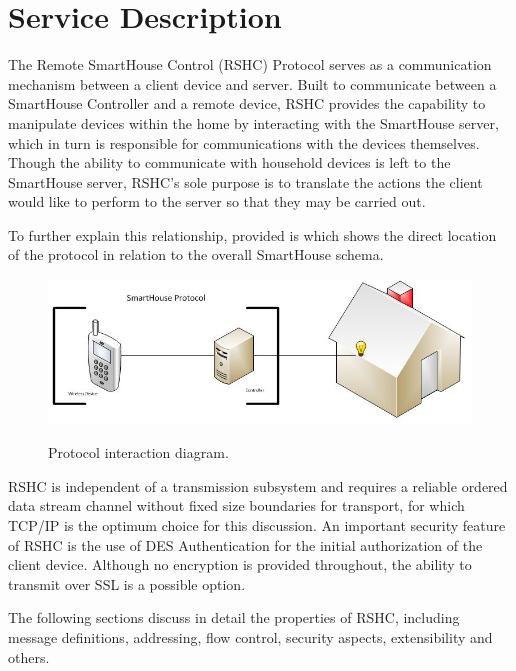 \section{Service Description}
\label{sec:serv_desc}

The Remote SmartHouse Control (RSHC) Protocol serves as a communication mechanism between a client device and server. Built to communicate between a SmartHouse Controller and a remote device, RSHC provides the capability to manipulate devices within the home by interacting with the SmartHouse server, which in turn is responsible for communications with the devices themselves. Though the ability to communicate with household devices is left to the SmartHouse server, RSHC's sole purpose is to translate the actions the client would like to perform to the server so that they may be carried out.


To further explain this relationship, provided is  which shows the direct location of the protocol in relation to the overall SmartHouse schema.

\begin{figure}[h]
  \centering
  \label{fig:serv_desc:service}
  \includegraphics[width=5in]{figures/desc_img.jpg}\\
  \caption{Protocol interaction diagram.}
\end{figure}

RSHC is independent of a transmission subsystem and requires a reliable ordered data stream channel without fixed size boundaries for transport, for which TCP/IP is the optimum choice for this discussion. An important security feature of RSHC is the use of DES Authentication for the initial authorization of the client device. Although no encryption is provided throughout, the ability to transmit over SSL is a possible option.

The following sections discuss in detail the properties of RSHC, including message definitions, addressing, flow control, security aspects, extensibility and others. 